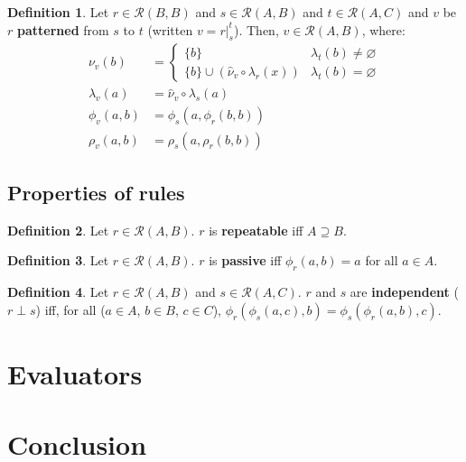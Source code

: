 \documentclass{article}
\theoremstyle{definition}
\newtheorem{definition}{Definition}[subsection]
\theoremstyle{plain}
\def\rule{\mathcal{R}}
\begin{document}
\begin{definition}
  Let $ r \in \rule (B, B) $
  and $ s \in \rule (A, B) $
  and $ t \in \rule (A, C) $
  and $ v $ be $ r $ \textbf{patterned} from $ s $ to $ t $ (written $ v = r \rvert_{s}^{t} $).
  Then, $ v \in \rule (A, B) $, where:
  \begin{align}
      \nu_v (b)    & = \begin{cases}
                         \{ b \}                                            & \lambda_t (b) \neq \varnothing \\
                         \{ b \} \cup (\widehat{\nu}_v \circ \lambda_r (x)) & \lambda_t (b) =    \varnothing
                       \end{cases} \\
  \lambda_v (a)    & = \widehat{\nu}_v \circ \lambda_s (a) \\
     \phi_v (a, b) & = \phi_s (a, \phi_r (b, b)) \\
     \rho_v (a, b) & = \rho_s (a, \rho_r (b, b)) 
  \end{align}
\end{definition}

\subsection{Properties of rules}

\begin{definition}
  Let $ r \in \rule (A, B) $. $ r $ is \textbf{repeatable} iff $ A \supseteq B $.
\end{definition}

\begin{definition}
  Let $ r \in \rule (A, B) $. $ r $ is \textbf{passive} iff $ \phi_r (a, b) = a $ for all $ a \in A$.
\end{definition}

\begin{definition}
  Let $ r \in \rule (A, B) $
  and $ s \in \rule (A, C) $.
  $r$ and $s$ are \textbf{independent} ($ r \perp s $) iff,
  for all ($ a \in A $, $ b \in B $, $ c \in C $),
  $ \phi_r (\phi_s (a, c), b) = \phi_s (\phi_r (a, b), c) $. 
\end{definition}

\section{Evaluators}

\section{Conclusion}
\end{document}
